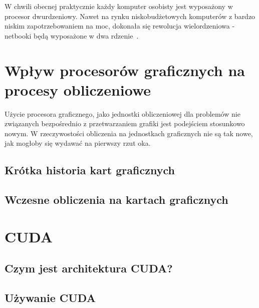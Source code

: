 W chwili obecnej praktycznie każdy komputer osobisty jest wyposażony w procesor dwurdzeniowy. Nawet na rynku niskobudżetowych komputerów z bardzo niskim zapotrzebowaniem na moc, dokonała się rewolucja wielordzeniowa - netbooki będą wyposażone w dwa rdzenie~\cite{intel:netbook}. 

\section{Wpływ procesorów graficznych na procesy obliczeniowe}

Użycie procesora graficznego, jako jednostki obliczeniowej dla problemów nie związanych bezpośrednio z przetwarzaniem grafiki jest podejściem stosunkowo nowym. W rzeczywostości obliczenia na jednostkach graficznych nie są tak nowe, jak mogłoby się wydawać na pierwszy rzut oka. 

\subsection{Krótka historia kart graficznych}

\subsection{Wczesne obliczenia na kartach graficznych}

\section{CUDA}

\subsection{Czym jest architektura CUDA?}

\subsection{Używanie CUDA}